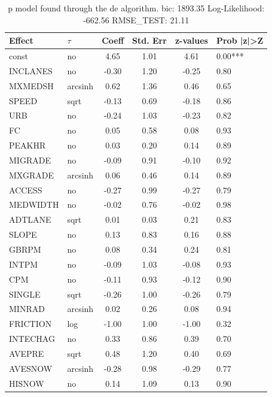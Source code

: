 \begin{table}
	\caption{p model found through the de algorithm. bic: 1893.35 Log-Likelihood: -662.56 RMSE_TEST: 21.11}
	\begin{center}
		\begin{tabular}{|l|l|c|c|c|l|}
			\hline
			Effect & $\tau$ & Coeff & Std. Err & z-values & Prob |z|>Z \\
			\hline
			const & no & 4.65 & 1.01 & 4.61 & 0.00*** \\
			\hline
			INCLANES & no & -0.30 & 1.20 & -0.25 & 0.80 \\
			\hline
			MXMEDSH & arcsinh & 0.62 & 1.36 & 0.46 & 0.65 \\
			\hline
			SPEED & sqrt & -0.13 & 0.69 & -0.18 & 0.86 \\
			\hline
			URB & no & -0.24 & 1.03 & -0.23 & 0.82 \\
			\hline
			FC & no & 0.05 & 0.58 & 0.08 & 0.93 \\
			\hline
			PEAKHR & no & 0.03 & 0.20 & 0.14 & 0.89 \\
			\hline
			MIGRADE & no & -0.09 & 0.91 & -0.10 & 0.92 \\
			\hline
			MXGRADE & arcsinh & 0.06 & 0.46 & 0.14 & 0.89 \\
			\hline
			ACCESS & no & -0.27 & 0.99 & -0.27 & 0.79 \\
			\hline
			MEDWIDTH & no & -0.02 & 0.76 & -0.02 & 0.98 \\
			\hline
			ADTLANE & sqrt & 0.01 & 0.03 & 0.21 & 0.83 \\
			\hline
			SLOPE & no & 0.13 & 0.83 & 0.16 & 0.88 \\
			\hline
			GBRPM & no & 0.08 & 0.34 & 0.24 & 0.81 \\
			\hline
			INTPM & no & -0.09 & 1.03 & -0.08 & 0.93 \\
			\hline
			CPM & no & -0.11 & 0.93 & -0.12 & 0.90 \\
			\hline
			SINGLE & sqrt & -0.26 & 1.00 & -0.26 & 0.79 \\
			\hline
			MINRAD & arcsinh & 0.02 & 0.26 & 0.08 & 0.94 \\
			\hline
			FRICTION & log & -1.00 & 1.00 & -1.00 & 0.32 \\
			\hline
			INTECHAG & no & 0.33 & 0.86 & 0.39 & 0.70 \\
			\hline
			AVEPRE & sqrt & 0.48 & 1.20 & 0.40 & 0.69 \\
			\hline
			AVESNOW & arcsinh & -0.28 & 0.98 & -0.29 & 0.77 \\
			\hline
			HISNOW & no & 0.14 & 1.09 & 0.13 & 0.90 \\

\end{tabular}
\end{center}
\end{table}
